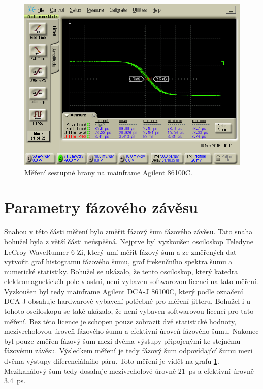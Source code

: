 \begin{figure}[htbp]
\includegraphics[width=\textwidth,keepaspectratio]{images/measurements/agilent_fall.png}\caption{Měření sestupné hrany na mainframe Agilent 86100C.}\label{agilent_fall}
\end{figure}

\section{Parametry fázového závěsu}
Snahou v této části měření bylo změřit fázový šum fázového závěsu. Tato snaha bohužel byla z větší části neúspěšná. Nejprve byl vyzkoušen osciloskop Teledyne LeCroy WaveRunner 6 Zi, který umí měřit fázový šum a ze změřených dat vytvořit graf histogramu fázového šumu, graf frekenčního spektra šumu a numerické statistiky. Bohužel se ukázalo, že tento osciloskop, který katedra elektromagnetickéh pole vlastní, není vybaven softwarovou licencí na tato měření. Vyzkoušen byl tedy mainframe Agilent DCA-J 86100C, který podle označení DCA-J obsahuje hardwarové vybavení potřebné pro měření jitteru. Bohužel i u tohoto osciloskopu se také ukázalo, že není vybaven softwarovou licencí pro tato měření. Bez této licence je schopen pouze zobrazit dvě statistické hodnoty, mezivrcholovou úroveň fázového šumu a efektivní úroveň fázového šumu. Nakonec byl pouze změřen fázový šum mezi dvěma výstupy připojenými ke stejnému fázovému závěsu. Výsledkem měření je tedy fázový šum odpovídající šumu mezi dvěma výstupy diferenciálního páru. Toto měření je vidět na grafu \ref{agilent_fall}. Mezikanálový šum tedy dosahuje mezivrcholové úrovně \SI{21}{\pico\second} a efektivní úrovně \SI{3.4}{\pico\second}.

